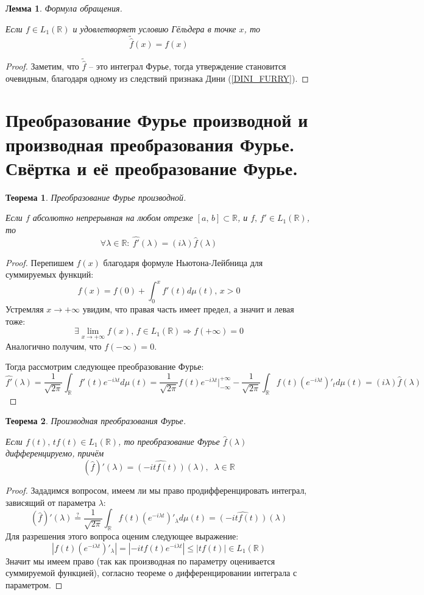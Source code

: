 \documentclass[a4paper,12pt]{article}
\renewcommand{\leq}{\ensuremath{\leqslant}}
\theoremstyle{plain}
\newtheorem{theorem}{Теорема}[section]
\newtheorem{lemma}{Лемма}[section]
\theoremstyle{definition}
\theoremstyle{remark}
\begin{document}
\begin{lemma}
	Формула обращения.

	Если $f \in L_1(\mathbb{R})$ и удовлетворяет условию Гёльдера в точке $x$, то
	\[\tilde{\hat{f}}(x) = f(x)\]
\end{lemma}

\begin{proof}
	Заметим, что $\tilde{\hat{f}}$ -- это интеграл Фурье, тогда утверждение становится очевидным, благодаря одному из следствий признака Дини (\ref{DINI_FURRY}).
\end{proof}

\section{Преобразование Фурье производной и производная преобразования Фурье. Свёртка и её преобразование Фурье.}
\begin{theorem}
	Преобразование Фурье производной.

	Если $f$ абсолютно непрерывная на любом отрезке $[a,\,b] \subset \mathbb{R}$, и $f,\, f' \in L_1(\mathbb{R})$, то
	\[\forall \lambda \in \mathbb{R}:\: \hat{f'}(\lambda) = (i\lambda)\hat{f}(\lambda)\]
\end{theorem}
\begin{proof}
	Перепишем $f(x)$ благодаря формуле Ньютона-Лейбница для суммируемых функций:
	\[f(x) = f(0) + \int_0^x f'(t)d\mu(t),\, x > 0\]
	Устремляя $x \to +\infty$ увидим, что правая часть имеет предел, а значит и левая тоже:
	\[\exists \lim_{x \to +\infty}f(x),\, f \in L_1(\mathbb{R}) \Rightarrow f
		(+\infty) = 0\]
	Аналогично получим, что $f(-\infty) = 0$.

	Тогда рассмотрим следующее преобразование Фурье:
	\[\hat{f'}(\lambda) = \frac{1}{\sqrt{2\pi}}\int_\mathbb{R}f'(t)e^{-i\lambda t}d\mu(t) = \frac{1}{\sqrt{2\pi}}f(t)e^{-i\lambda t}|_{-\infty}^{+\infty} - \frac{1}{\sqrt{2\pi}}\int_\mathbb{R}f(t)(e^{-i\lambda t})'_td\mu(t) = (i\lambda)\hat{f}(\lambda)\]
\end{proof}

\begin{theorem}
	Производная преобразования Фурье.

	Если $f(t),\, tf(t) \in L_1(\mathbb{R})$, то преобразование Фурье $\hat{f}(\lambda)$ дифференцируемо, причём
	\[(\hat{f})'(\lambda) = \widehat{(-itf(t))}(\lambda),\;\; \lambda \in \mathbb{R}\]
\end{theorem}
\begin{proof}
	Зададимся вопросом, имеем ли мы право продифференцировать интеграл, зависящий от параметра $\lambda$:
	\[(\hat{f})'(\lambda) \stackrel{?}{=} \frac{1}{\sqrt{2\pi}}\int_\mathbb{R}f(t)(e^{-i\lambda t})'_\lambda d\mu(t) = \widehat{(-itf(t))}(\lambda)\]
	Для разрешения этого вопроса оценим следующее выражение:
	\[\left|f(t)(e^{-i\lambda t})'_\lambda\right| = \left|-itf(t)e^{-i\lambda t}\right| \leq |tf(t)| \in L_1(\mathbb{R})\]
	Значит мы имеем право (так как производная по параметру оценивается суммируемой функцией), согласно теореме о дифференцировании интеграла с параметром.
\end{proof}
\end{document}
